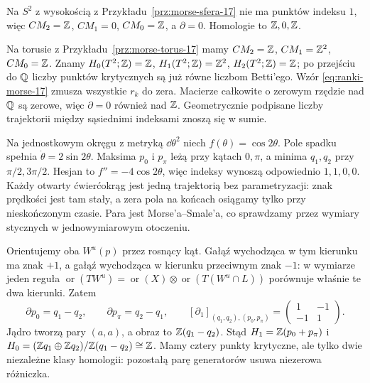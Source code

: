 \begin{przyklad}
Na $S^2$ z wysokością
z Przykładu~\ref{prz:morse-sfera-17}
nie ma punktów indeksu $1$,
więc
$CM_2=\mathbb{Z}$, $CM_1=0$,
$CM_0=\mathbb{Z}$, a $\partial=0$.
Homologie to $\mathbb{Z},0,\mathbb{Z}$.

Na torusie z
Przykładu~\ref{prz:morse-torus-17}
mamy
$CM_2=\mathbb{Z}$, $CM_1=\mathbb{Z}^2$,
$CM_0=\mathbb{Z}$. Znamy
$H_0(T^2;\mathbb{Z})=\mathbb{Z}$,
$H_1(T^2;\mathbb{Z})=\mathbb{Z}^2$,
$H_2(T^2;\mathbb{Z})=\mathbb{Z}$;
po przejściu do $\mathbb{Q}$
liczby punktów krytycznych
są już równe liczbom
Betti'ego. Wzór
\eqref{eq:ranki-morse-17}
zmusza wszystkie
$r_k$ do zera.
Macierze całkowite
o zerowym rzędzie
nad $\mathbb{Q}$ są zerowe,
więc $\partial=0$
również nad $\mathbb{Z}$.
Geometrycznie podpisane
liczby trajektorii między
sąsiednimi indeksami
znoszą się w sumie.
\end{przyklad}

\begin{przyklad}
\label{prz:morse-okrag-znaki-22}
Na jednostkowym okręgu z metryką $\dd\theta^2$ niech
$f(\theta)=\cos2\theta$. Pole spadku spełnia
$\dot\theta=2\sin2\theta$.
Maksima $p_0$ i $p_\pi$ leżą przy kątach $0,\pi$,
a minima $q_1,q_2$ przy $\pi/2,3\pi/2$.
Hesjan to $f''=-4\cos2\theta$,
więc indeksy wynoszą odpowiednio $1,1,0,0$.
Każdy otwarty ćwierćokrąg jest jedną trajektorią bez parametryzacji:
znak prędkości jest tam stały, a zera pola na końcach
osiągamy tylko przy nieskończonym czasie.
Para jest Morse'a--Smale'a, co sprawdzamy przez wymiary
stycznych w jednowymiarowym otoczeniu.

Orientujemy oba $W^u(p)$ przez rosnący kąt.
Gałąź wychodząca w tym kierunku ma znak $+1$,
a gałąź wychodząca w kierunku przeciwnym znak $-1$:
w wymiarze jeden reguła
$\operatorname{or}(TW^u)=\operatorname{or}(X)\otimes
\operatorname{or}(T(W^u\cap L))$
porównuje właśnie te dwa kierunki.
Zatem
\[
 \partial p_0=q_1-q_2,\qquad
 \partial p_\pi=q_2-q_1,\qquad
 [\partial_1]_{(q_1,q_2),(p_0,p_\pi)}
 =\begin{pmatrix}1&-1\\-1&1\end{pmatrix}.
\]
Jądro tworzą pary $(a,a)$, a obraz to $\mathbb{Z}(q_1-q_2)$.
Stąd $H_1=\mathbb{Z}(p_0+p_\pi)$ i
$H_0=(\mathbb{Z} q_1\oplus\mathbb{Z} q_2)/\mathbb{Z}(q_1-q_2)\cong\mathbb{Z}$.
Mamy cztery punkty krytyczne, ale tylko dwie niezależne
klasy homologii: pozostałą parę generatorów usuwa niezerowa różniczka.
\end{przyklad}

